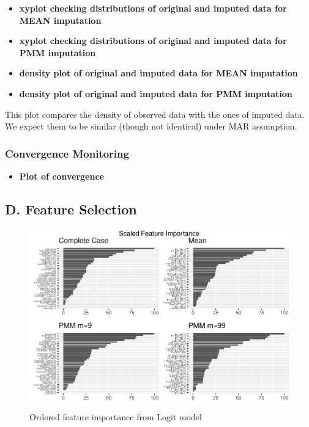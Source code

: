 \documentclass[12pt,]{article}
\providecommand{\tightlist}{%
  \setlength{\itemsep}{0pt}\setlength{\parskip}{0pt}}
\begin{document}
\begin{itemize}
\item
  \textbf{xyplot checking distributions of original and imputed data for
  MEAN imputation}
\item
  \textbf{xyplot checking distributions of original and imputed data for
  PMM imputation}
\item
  \textbf{density plot of original and imputed data for MEAN imputation}
\item
  \textbf{density plot of original and imputed data for PMM imputation}
\end{itemize}

This plot compares the density of observed data with the ones of imputed
data. We expect them to be similar (though not identical) under MAR
assumption.

\subsubsection{Convergence Monitoring}\label{convergence-monitoring}

\begin{itemize}
\tightlist
\item
  \textbf{Plot of convergence}
\end{itemize}

\subsection{D. Feature Selection}\label{d.-feature-selection}

\begin{figure}[H]

{\centering \includegraphics[width=1\linewidth]{figure/graphics-unnamed-chunk-18-1} 

}

\caption{\label{fig:rfe-logit}Ordered feature importance from Logit model}\label{fig:unnamed-chunk-18}
\end{figure}
\end{document}
